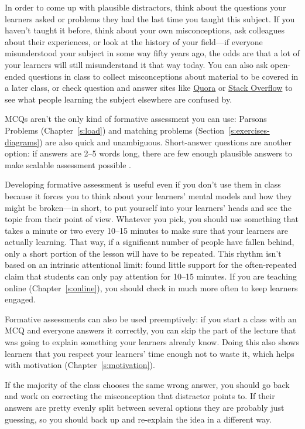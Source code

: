 In order to come up with plausible distractors, think about the
questions your learners asked or problems they had the last time you
taught this subject. If you haven't taught it before, think about your
own misconceptions, ask colleagues about their experiences, or look at
the history of your field---if everyone misunderstood your subject in
some way fifty years ago, the odds are that a lot of your learners
will still misunderstand it that way today. You can also ask
open-ended questions in class to collect misconceptions about material
to be covered in a later class, or check question and answer sites
like \href{http://www.quora.com}{Quora} or \href{https://stackoverflow.com/}{Stack Overflow} to see what
people learning the subject elsewhere are confused by.

MCQs aren't the only kind of formative assessment you can use: Parsons
Problems (Chapter~\ref{s:load}) and matching problems
(Section~\ref{s:exercises-diagrams}) are also quick and unambiguous.
Short-answer questions are another option: if answers are 2--5 words
long, there are few enough plausible answers to make scalable assessment
possible \cite{Mill2016a}.

Developing formative assessment is useful even if you don't use them in
class because it forces you to think about your learners' mental models
and how they might be broken---in short, to put yourself into your
learners' heads and see the topic from their point of view. Whatever you
pick, you should use something that takes a minute or two every 10--15
minutes to make sure that your learners are actually learning. That way,
if a significant number of people have fallen behind, only a short
portion of the lesson will have to be repeated. This rhythm isn't based
on an intrinsic attentional limit: \cite{Wils2007} found little
support for the often-repeated claim that students can only pay
attention for 10--15 minutes. If you are teaching online
(Chapter~\ref{s:online}), you should check in much more often to keep
learners engaged.

Formative assessments can also be used preemptively: if you start a
class with an MCQ and everyone answers it correctly, you can skip the
part of the lecture that was going to explain something your learners
already know. Doing this also shows learners that you respect your
learners' time enough not to waste it, which helps with motivation
(Chapter~\ref{s:motivation}).

If the majority of the class chooses the same wrong answer, you should
go back and work on correcting the misconception that distractor points
to. If their answers are pretty evenly split between several options
they are probably just guessing, so you should back up and re-explain
the idea in a different way.


